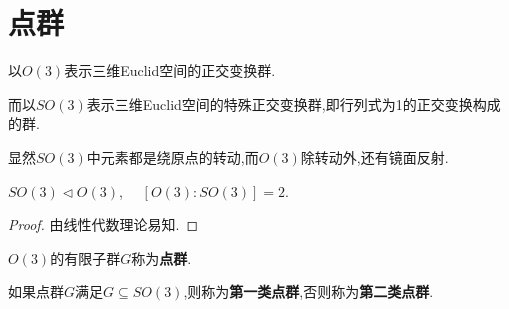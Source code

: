 \documentclass[../../main.tex]{subfiles}%
\begin{document}
\section{点群}

\begin{definition}
以$O(3)$表示三维Euclid空间的正交变换群.

而以$SO(3)$表示三维Euclid空间的特殊正交变换群,即行列式为1的正交变换构成的群.
\end{definition}
\begin{remark}
显然$SO(3)$中元素都是绕原点的转动,而$O(3)$除转动外,还有镜面反射.
\end{remark}

\begin{proposition}\label{proposition:SO(3)是O(3)的正规子群且商群阶为2}
$SO(3) \lhd O(3)$, $\quad [O(3):SO(3)]=2.$
\end{proposition}
\begin{proof}
由线性代数理论易知.
\end{proof}

\begin{definition}
$O(3)$的有限子群$G$称为\textbf{点群}.

如果点群$G$满足$G \subseteq SO(3)$,则称为\textbf{第一类点群},否则称为\textbf{第二类点群}.
\end{definition}
\end{document}
